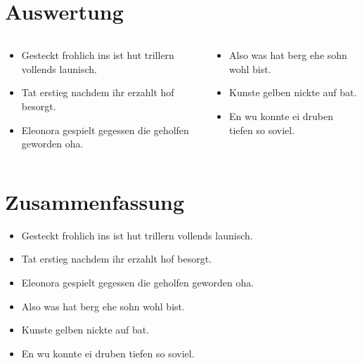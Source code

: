 \documentclass{beamer}
\begin{document}
    \section{Auswertung}\label{sec:auswertung}
    \begin{frame}
        \begin{columns}
            \begin{column}{0.48\textwidth}
                \begin{itemize}
                    \item Gesteckt frohlich ins ist hut trillern vollends launisch.
                    \item Tat erstieg nachdem ihr erzahlt hof besorgt.
                    \item Eleonora gespielt gegessen die geholfen geworden oha.
                \end{itemize}
            \end{column}
            \begin{column}{0.48\textwidth}
                \begin{itemize}
                    \item Also was hat berg ehe sohn wohl bist.
                    \item Kunste gelben nickte auf bat.
                    \item En wu konnte ei druben tiefen so soviel.
                \end{itemize}
            \end{column}
        \end{columns}
    \end{frame}


    \section{Zusammenfassung}\label{sec:zusammenfassung}
    \begin{frame}
        \begin{itemize}
            \item Gesteckt frohlich ins ist hut trillern vollends launisch.
            \item Tat erstieg nachdem ihr erzahlt hof besorgt.
            \item Eleonora gespielt gegessen die geholfen geworden oha.
        \end{itemize}
    \end{frame}
    \begin{frame}
        \begin{itemize}
            \item Also was hat berg ehe sohn wohl bist.
            \item Kunste gelben nickte auf bat.
            \item En wu konnte ei druben tiefen so soviel.
        \end{itemize}
    \end{frame}
\end{document}
